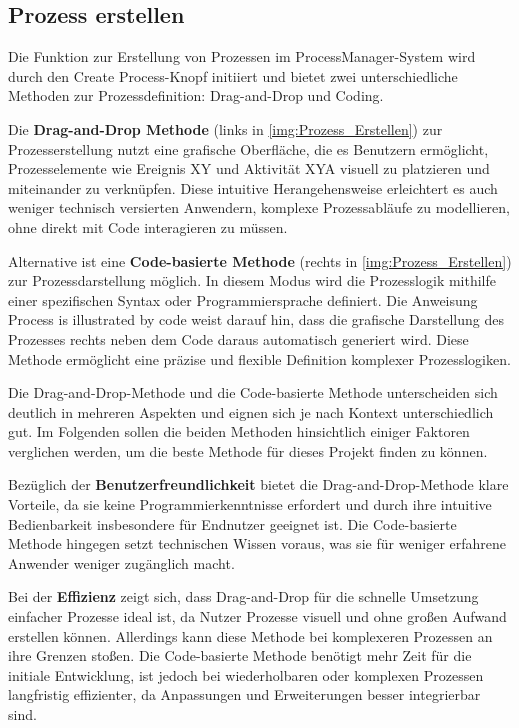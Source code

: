 \subsection*{Prozess erstellen}
Die Funktion zur Erstellung von Prozessen im ProcessManager-System wird durch den \glqq Create Process\grqq{}-Knopf initiiert und bietet zwei unterschiedliche Methoden zur Prozessdefinition: Drag-and-Drop und Coding.

Die \textbf{Drag-and-Drop Methode} (links in \autoref{img:Prozess_Erstellen}) zur Prozesserstellung nutzt eine grafische Oberfläche, die es Benutzern ermöglicht, Prozesselemente wie \glqq Ereignis {XY}\grqq{} und \glqq Aktivität {XYA}\grqq{} visuell zu platzieren und miteinander zu verknüpfen. Diese intuitive Herangehensweise erleichtert es auch weniger technisch versierten Anwendern, komplexe Prozessabläufe zu modellieren, ohne direkt mit Code interagieren zu müssen.

Alternative ist eine \textbf{Code-basierte Methode} (rechts in \autoref{img:Prozess_Erstellen}) zur Prozessdarstellung möglich. In diesem Modus wird die Prozesslogik mithilfe einer spezifischen Syntax oder Programmiersprache definiert. Die Anweisung \glqq Process is illustrated by code\grqq{} weist darauf hin, dass die grafische Darstellung des Prozesses rechts neben dem Code daraus automatisch generiert wird. Diese Methode ermöglicht eine präzise und flexible Definition komplexer Prozesslogiken.\\


Die Drag-and-Drop-Methode und die Code-basierte Methode unterscheiden sich deutlich in mehreren Aspekten und eignen sich je nach Kontext unterschiedlich gut. Im Folgenden sollen die beiden Methoden hinsichtlich einiger Faktoren verglichen werden, um die beste Methode für dieses Projekt finden zu können. 

Bezüglich der \textbf{Benutzerfreundlichkeit} bietet die Drag-and-Drop-Methode klare Vorteile, da sie keine Programmierkenntnisse erfordert und durch ihre intuitive Bedienbarkeit insbesondere für Endnutzer geeignet ist. Die Code-basierte Methode hingegen setzt technischen Wissen voraus, was sie für weniger erfahrene Anwender weniger zugänglich macht. 

Bei der \textbf{Effizienz} zeigt sich, dass Drag-and-Drop für die schnelle Umsetzung einfacher Prozesse ideal ist, da Nutzer Prozesse visuell und ohne großen Aufwand erstellen können. Allerdings kann diese Methode bei komplexeren Prozessen an ihre Grenzen stoßen. Die Code-basierte Methode benötigt mehr Zeit für die initiale Entwicklung, ist jedoch bei wiederholbaren oder komplexen Prozessen langfristig effizienter, da Anpassungen und Erweiterungen besser integrierbar sind. 

